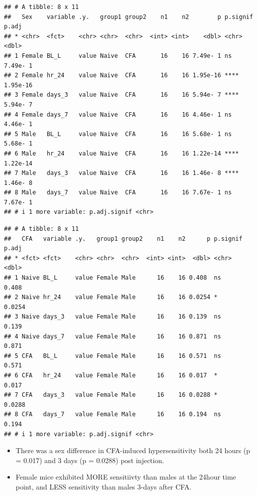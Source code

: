 \documentclass[
]{book}
\begin{document}
\begin{verbatim}
## # A tibble: 8 x 11
##   Sex    variable .y.   group1 group2    n1    n2        p p.signif    p.adj
## * <chr>  <fct>    <chr> <chr>  <chr>  <int> <int>    <dbl> <chr>       <dbl>
## 1 Female BL_L     value Naive  CFA       16    16 7.49e- 1 ns       7.49e- 1
## 2 Female hr_24    value Naive  CFA       16    16 1.95e-16 ****     1.95e-16
## 3 Female days_3   value Naive  CFA       16    16 5.94e- 7 ****     5.94e- 7
## 4 Female days_7   value Naive  CFA       16    16 4.46e- 1 ns       4.46e- 1
## 5 Male   BL_L     value Naive  CFA       16    16 5.68e- 1 ns       5.68e- 1
## 6 Male   hr_24    value Naive  CFA       16    16 1.22e-14 ****     1.22e-14
## 7 Male   days_3   value Naive  CFA       16    16 1.46e- 8 ****     1.46e- 8
## 8 Male   days_7   value Naive  CFA       16    16 7.67e- 1 ns       7.67e- 1
## # i 1 more variable: p.adj.signif <chr>
\end{verbatim}

\begin{verbatim}
## # A tibble: 8 x 11
##   CFA   variable .y.   group1 group2    n1    n2      p p.signif  p.adj
## * <fct> <fct>    <chr> <chr>  <chr>  <int> <int>  <dbl> <chr>     <dbl>
## 1 Naive BL_L     value Female Male      16    16 0.408  ns       0.408 
## 2 Naive hr_24    value Female Male      16    16 0.0254 *        0.0254
## 3 Naive days_3   value Female Male      16    16 0.139  ns       0.139 
## 4 Naive days_7   value Female Male      16    16 0.871  ns       0.871 
## 5 CFA   BL_L     value Female Male      16    16 0.571  ns       0.571 
## 6 CFA   hr_24    value Female Male      16    16 0.017  *        0.017 
## 7 CFA   days_3   value Female Male      16    16 0.0288 *        0.0288
## 8 CFA   days_7   value Female Male      16    16 0.194  ns       0.194 
## # i 1 more variable: p.adj.signif <chr>
\end{verbatim}

\begin{itemize}
\item
  There was a sex difference in CFA-induced hypersensitivity both 24 hours (p = 0.017) and 3 days (p = 0.0288) post injection.
\item
  Female mice exhibited MORE sensitiivty than males at the 24hour time point, and LESS sensitivity than males 3-days after CFA.
\end{itemize}
\end{document}
